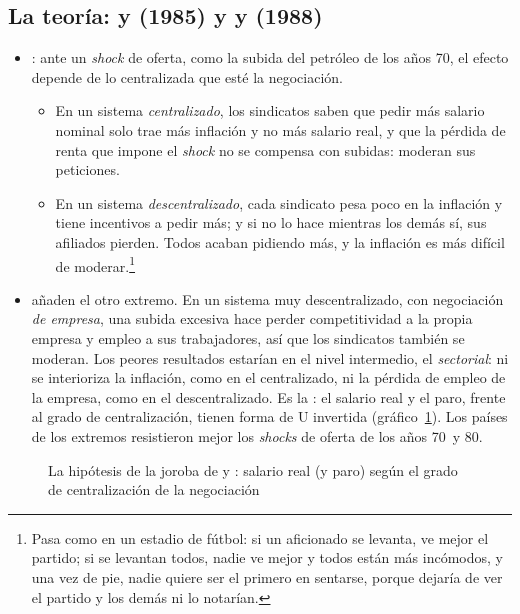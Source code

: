 \documentclass[11pt]{article}
\begin{document}
\subsection{La teoría:  y  (1985) y  y  (1988)}\label{anexo:joroba}

\begin{itemize}
\item \textcite{BrunoSachs1985Economics}: ante un \emph{shock} de oferta, como la subida del petróleo de los años 70, el efecto depende de lo centralizada que esté la negociación.
  \begin{itemize}
  \item En un sistema \emph{centralizado}, los sindicatos saben que pedir más salario nominal solo trae más inflación y no más salario real, y que la pérdida de renta que impone el \emph{shock} no se compensa con subidas: moderan sus peticiones.
  \item En un sistema \emph{descentralizado}, cada sindicato pesa poco en la inflación y tiene incentivos a pedir más; y si no lo hace mientras los demás sí, sus afiliados pierden. Todos acaban pidiendo más, y la inflación es más difícil de moderar.\footnote{Pasa como en un estadio de fútbol: si un aficionado se levanta, ve mejor el partido; si se levantan todos, nadie ve mejor y todos están más incómodos, y una vez de pie, nadie quiere ser el primero en sentarse, porque dejaría de ver el partido y los demás ni lo notarían.}
  \end{itemize}
\item \textcite{CalmforsDriffill1988} añaden el otro extremo. En un sistema muy descentralizado, con negociación \emph{de empresa}, una subida excesiva hace perder competitividad a la propia empresa y empleo a sus trabajadores, así que los sindicatos también se moderan. Los peores resultados estarían en el nivel intermedio, el \emph{sectorial}: ni se interioriza la inflación, como en el centralizado, ni la pérdida de empleo de la empresa, como en el descentralizado. Es la : el salario real y el paro, frente al grado de centralización, tienen forma de U invertida (gráfico~\ref{fig:joroba}). Los países de los extremos resistieron mejor los \emph{shocks} de oferta de los años 70~y 80.
\end{itemize}

\begin{figure}[H]
\centering
\caption{La hipótesis de la joroba de  y : salario real (y paro) según el grado de centralización de la negociación}\label{fig:joroba}
\end{figure}
\end{document}
